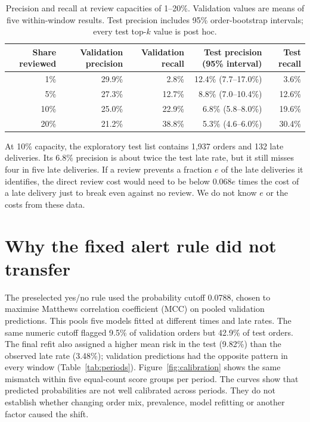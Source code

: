 \documentclass[11pt,a4paper]{article}
\begin{document}
\begin{table}[h]
\centering\small
\caption{Precision and recall at review capacities of 1--20\%. Validation values are means of five within-window results. Test precision includes 95\% order-bootstrap intervals; every test top-$k$ value is post hoc.}
\label{tab:topk}
\begin{tabular}{@{}rrrrr@{}}
\toprule
Share reviewed & Validation precision & Validation recall & Test precision (95\% interval) & Test recall \\
\midrule
1\% & 29.9\% & 2.8\% & 12.4\% (7.7--17.0\%) & 3.6\% \\
5\% & 27.3\% & 12.7\% & 8.8\% (7.0--10.4\%) & 12.6\% \\
10\% & 25.0\% & 22.9\% & 6.8\% (5.8--8.0\%) & 19.6\% \\
20\% & 21.2\% & 38.8\% & 5.3\% (4.6--6.0\%) & 30.4\% \\
\bottomrule
\end{tabular}
\end{table}

At 10\% capacity, the exploratory test list contains 1,937 orders and 132 late deliveries. Its 6.8\% precision is about twice the test late rate, but it still misses four in five late deliveries. If a review prevents a fraction $e$ of the late deliveries it identifies, the direct review cost would need to be below $0.068e$ times the cost of a late delivery just to break even against no review. We do not know $e$ or the costs from these data.

\section*{Why the fixed alert rule did not transfer}
The preselected yes/no rule used the probability cutoff 0.0788, chosen to maximise Matthews correlation coefficient (MCC) on pooled validation predictions. This pools five models fitted at different times and late rates. The same numeric cutoff flagged 9.5\% of validation orders but 42.9\% of test orders. The final refit also assigned a higher mean risk in the test (9.82\%) than the observed late rate (3.48\%); validation predictions had the opposite pattern in every window (Table~\ref{tab:periods}). Figure~\ref{fig:calibration} shows the same mismatch within five equal-count score groups per period. The curves show that predicted probabilities are not well calibrated across periods. They do not establish whether changing order mix, prevalence, model refitting or another factor caused the shift.
\end{document}
